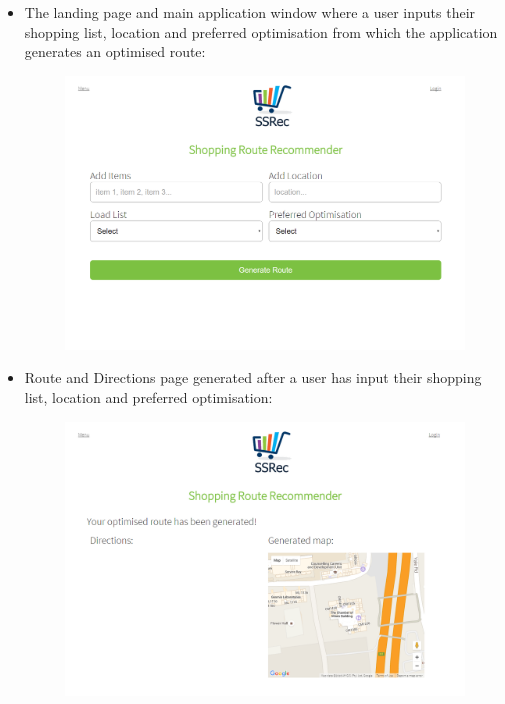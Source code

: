 \documentclass[10pt, a4paper, onecolumn]{scrartcl}
\begin{document}
\begin{itemize}
					\item The landing page and main application window where a user inputs their shopping list, location and preferred optimisation from which the application generates an optimised route:
					\begin{figure}[h!]
						\centering
						\includegraphics[scale = 0.5]{Images/index.PNG}
						\label{menu}
					\end{figure}
					
					\item Route and Directions page generated after a user has input their shopping list, location and preferred optimisation:
					\begin{figure}[h!]
						\centering
						\includegraphics[scale = 0.5]{Images/routeGen.PNG}
						\label{menu}
					\end{figure}
					

\end{itemize}
\end{document}
